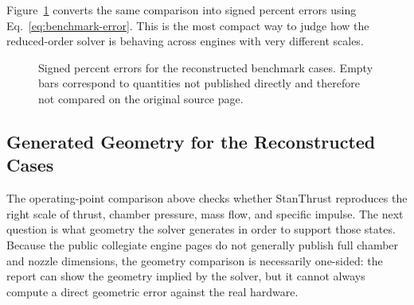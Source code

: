 \documentclass[11pt]{article}
\begin{document}
Figure~\ref{fig:reconstructed-errors} converts the same comparison into signed percent errors using Eq.~\eqref{eq:benchmark-error}. This is the most compact way to judge how the reduced-order solver is behaving across engines with very different scales.

\begin{figure}[H]
\centering
{}
\caption{Signed percent errors for the reconstructed benchmark cases. Empty bars correspond to quantities not published directly and therefore not compared on the original source page.}
\label{fig:reconstructed-errors}
\end{figure}

\subsection*{Generated Geometry for the Reconstructed Cases}
The operating-point comparison above checks whether StanThrust reproduces the right scale of thrust, chamber pressure, mass flow, and specific impulse. The next question is what geometry the solver generates in order to support those states. Because the public collegiate engine pages do not generally publish full chamber and nozzle dimensions, the geometry comparison is necessarily one-sided: the report can show the geometry implied by the solver, but it cannot always compute a direct geometric error against the real hardware.
\end{document}
